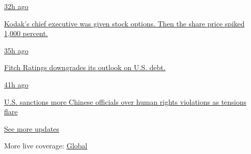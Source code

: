 \href{https://www.nytimes3xbfgragh.onion/live/2020/07/31/business/stock-market-today-coronavirus?action=click\&pgtype=Article\&state=default\&region=MAIN_CONTENT_1\&context=storylines_live_updates\#kodaks-chief-executive-was-given-stock-options-then-the-share-price-spiked-1000-percent}{32h
ago}

\href{https://www.nytimes3xbfgragh.onion/live/2020/07/31/business/stock-market-today-coronavirus?action=click\&pgtype=Article\&state=default\&region=MAIN_CONTENT_1\&context=storylines_live_updates\#kodaks-chief-executive-was-given-stock-options-then-the-share-price-spiked-1000-percent}{Kodak's
chief executive was given stock options. Then the share price spiked
1,000 percent.}

\href{https://www.nytimes3xbfgragh.onion/live/2020/07/31/business/stock-market-today-coronavirus?action=click\&pgtype=Article\&state=default\&region=MAIN_CONTENT_1\&context=storylines_live_updates\#fitch-ratings-downgrades-its-outlook-on-us-debt}{35h
ago}

\href{https://www.nytimes3xbfgragh.onion/live/2020/07/31/business/stock-market-today-coronavirus?action=click\&pgtype=Article\&state=default\&region=MAIN_CONTENT_1\&context=storylines_live_updates\#fitch-ratings-downgrades-its-outlook-on-us-debt}{Fitch
Ratings downgrades its outlook on U.S. debt.}

\href{https://www.nytimes3xbfgragh.onion/live/2020/07/31/business/stock-market-today-coronavirus?action=click\&pgtype=Article\&state=default\&region=MAIN_CONTENT_1\&context=storylines_live_updates\#us-sanctions-more-chinese-officials-over-human-rights-violations-as-tensions-flare}{41h
ago}

\href{https://www.nytimes3xbfgragh.onion/live/2020/07/31/business/stock-market-today-coronavirus?action=click\&pgtype=Article\&state=default\&region=MAIN_CONTENT_1\&context=storylines_live_updates\#us-sanctions-more-chinese-officials-over-human-rights-violations-as-tensions-flare}{U.S.
sanctions more Chinese officials over human rights violations as
tensions flare}

\href{https://www.nytimes3xbfgragh.onion/live/2020/07/31/business/stock-market-today-coronavirus?action=click\&pgtype=Article\&state=default\&region=MAIN_CONTENT_1\&context=storylines_live_updates}{See
more updates}

More live coverage:
\href{https://www.nytimes3xbfgragh.onion/2020/08/01/world/coronavirus-covid-19.html?action=click\&pgtype=Article\&state=default\&region=MAIN_CONTENT_1\&context=storylines_live_updates}{Global}

